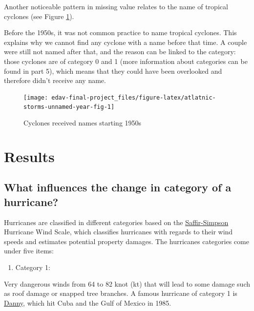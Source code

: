 \documentclass[]{book}
\providecommand{\tightlist}{%
  \setlength{\itemsep}{0pt}\setlength{\parskip}{0pt}}
\begin{document}
Another noticeable pattern in missing value relates to the name of tropical cyclones (see Figure \ref{fig:atlatnic-storms-unnamed-year-fig}).

Before the 1950s, it was not common practice to name tropical cyclones. This explains why we cannot find any cyclone with a name before that time. A couple were still not named after that, and the reason can be linked to the category: those cyclones are of category 0 and 1 (more information about categories can be found in part 5), which means that they could have been overlooked and therefore didn't receive any name.

\begin{figure}

{\centering \texttt{[image: edav-final-project\_files/figure-latex/atlatnic-storms-unnamed-year-fig-1]} 

}

\caption{Cyclones received names starting 1950s}\label{fig:atlatnic-storms-unnamed-year-fig}
\end{figure}

\hypertarget{result}{%
\chapter{Results}\label{result}}

\hypertarget{what-influences-the-change-in-category-of-a-hurricane}{%
\section{What influences the change in category of a hurricane?}\label{what-influences-the-change-in-category-of-a-hurricane}}

Hurricanes are classified in different categories based on the \href{https://www.nhc.noaa.gov/aboutsshws.php}{Saffir-Simpson} Hurricane Wind Scale, which classifies hurricanes with regards to their wind speeds and estimates potential property damages. The hurricanes categories come under five items:

\begin{enumerate}
\def\labelenumi{(\arabic{enumi})}
\tightlist
\item
  Category 1:
\end{enumerate}

Very dangerous winds from 64 to 82 knot (kt) that will lead to some damage such as roof damage or snapped tree branches. A famous hurricane of category 1 is \href{https://en.wikipedia.org/wiki/Hurricane_Danny_(1985)}{Danny}, which hit Cuba and the Gulf of Mexico in 1985.
\end{document}
